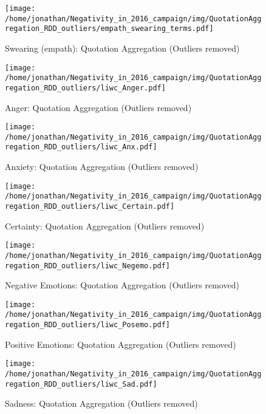 \begin{figure}[h]\centering
\texttt{[image: /home/jonathan/Negativity\_in\_2016\_campaign/img/QuotationAggregation\_RDD\_outliers/empath\_swearing\_terms.pdf]}
\caption{Swearing (empath): Quotation Aggregation (Outliers removed)}
\label{fig: qa_Swearing (empath)}
\end
{figure}

\begin{figure}[h]\centering
\texttt{[image: /home/jonathan/Negativity\_in\_2016\_campaign/img/QuotationAggregation\_RDD\_outliers/liwc\_Anger.pdf]}
\caption{Anger: Quotation Aggregation (Outliers removed)}
\label{fig: qa_Anger}
\end
{figure}

\begin{figure}[h]\centering
\texttt{[image: /home/jonathan/Negativity\_in\_2016\_campaign/img/QuotationAggregation\_RDD\_outliers/liwc\_Anx.pdf]}
\caption{Anxiety: Quotation Aggregation (Outliers removed)}
\label{fig: qa_Anxiety}
\end
{figure}

\begin{figure}[h]\centering
\texttt{[image: /home/jonathan/Negativity\_in\_2016\_campaign/img/QuotationAggregation\_RDD\_outliers/liwc\_Certain.pdf]}
\caption{Certainty: Quotation Aggregation (Outliers removed)}
\label{fig: qa_Certainty}
\end
{figure}

\begin{figure}[h]\centering
\texttt{[image: /home/jonathan/Negativity\_in\_2016\_campaign/img/QuotationAggregation\_RDD\_outliers/liwc\_Negemo.pdf]}
\caption{Negative Emotions: Quotation Aggregation (Outliers removed)}
\label{fig: qa_Negative Emotions}
\end
{figure}

\begin{figure}[h]\centering
\texttt{[image: /home/jonathan/Negativity\_in\_2016\_campaign/img/QuotationAggregation\_RDD\_outliers/liwc\_Posemo.pdf]}
\caption{Positive Emotions: Quotation Aggregation (Outliers removed)}
\label{fig: qa_Positive Emotions}
\end
{figure}

\begin{figure}[h]\centering
\texttt{[image: /home/jonathan/Negativity\_in\_2016\_campaign/img/QuotationAggregation\_RDD\_outliers/liwc\_Sad.pdf]}
\caption{Sadness: Quotation Aggregation (Outliers removed)}
\label{fig: qa_Sadness}
\end
{figure}

